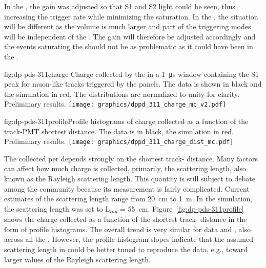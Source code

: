 In the , the  gain was adjusted so that S1 and S2 light could be seen, thus increasing the trigger rate while minimizing the   saturation. 
In the , the situation will be different as the volume is much larger and part of the triggering modes will be independent of the . 
The  gain will therefore be adjusted accordingly and the events saturating the  should not be as problematic as it could have been in the .

\begin{dunefigure}{fig:dp-pds-311charge}{ Charge collected by the  in a \SI{1}{\us} window containing the S1 peak for muon-like tracks triggered by the  panels. The data is shown in black and the simulation in red. The distributions are normalized to unity for clarity. Preliminary results.}
\texttt{[image: graphics/dppd\_311\_charge\_mc\_v2.pdf]}
\end{dunefigure}

\begin{dunefigure}{fig:dp-pds-311profile}{Profile histograms of charge collected as a function of the track-PMT shortest distance. The data is in black, the simulation in red. Preliminary results.}
\texttt{[image: graphics/dppd\_311\_charge\_dist\_mc.pdf]}
\end{dunefigure}


The  collected per  depends strongly on the shortest track- distance. Many factors can affect how much charge is collected, primarily, the scattering length, also known as the Rayleigh scattering length. This quantity is still subject to debate among the  community because its measurement is fairly complicated. Current estimates of the scattering length range from \SI{20}{\cm} to \SI{1}{\m}.
In the  simulation, the scattering length was set to L$_{ray}$ = \SI{55}{\cm}.
Figure~\ref{fig:dp-pds-311profile} shows the charge collected as a function of the shortest track- distance in the form of profile histograms. The overall trend is very similar for data and , also across all the . However, the profile histogram slopes indicate that the assumed scattering length in  could be better tuned to reproduce the data, e.g., toward larger values of the Rayleigh scattering length.

